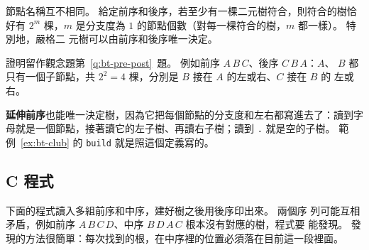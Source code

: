 \begin{theorem}
\label{thm:bt-pre-post}
節點名稱互不相同。 給定前序和後序，若至少有一棵二元樹符合，則符合的樹恰好有 $2^m$
棵，$m$ 是分支度為 $1$ 的節點個數（對每一棵符合的樹，$m$ 都一樣）。 特別地，嚴格二
元樹可以由前序和後序唯一決定。
\end{theorem}

證明留作觀念題第~\ref{q:bt-pre-post}~題。 例如前序 $A\,B\,C$、後序 $C\,B\,A$：$A$、
$B$ 都只有一個子節點，共 $2^2 = 4$ 棵，分別是 $B$ 接在 $A$ 的左或右、$C$ 接在 $B$ 的
左或右。

\textbf{延伸前序}也能唯一決定樹，因為它把每個節點的分支度和左右都寫進去了：讀到字
母就是一個節點，接著讀它的左子樹、再讀右子樹；讀到 \texttt{.} 就是空的子樹。 範
例~\ref{ex:bt-club} 的 \texttt{build} 就是照這個定義寫的。

\subsection{C 程式}

下面的程式讀入多組前序和中序，建好樹之後用後序印出來。 兩個序
列可能互相矛盾，例如前序 $A\,B\,C\,D$、中序 $B\,D\,A\,C$ 根本沒有對應的樹，程式要
能發現。 發現的方法很簡單：每次找到的根，在中序裡的位置必須落在目前這一段裡面。

